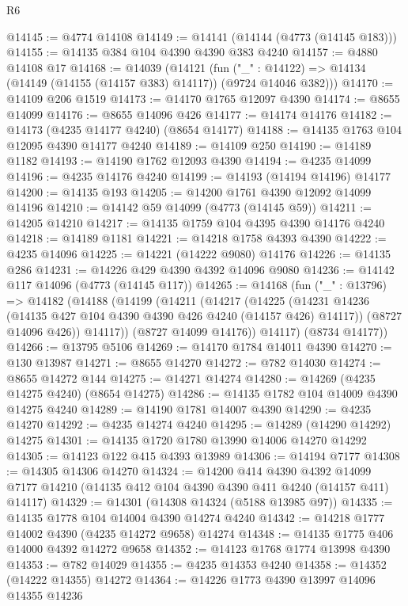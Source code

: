 \begin{lexlean}{R6}
\begin{coremodule}
@14145 := @4774 @14108
@14149 := @14141 (@14144 (@4773 (@14145 @183)))
@14155 := @14135 @384 @104 @4390 @4390 @383 @4240
@14157 := @4880 @14108 @17
@14168 := @14039
    (@14121
      (fun ("_" : @14122) => @14134 (@14149 (@14155 (@14157 @383) @14117)) (@9724 @14046 @382)))
@14170 := @14109 @206 @1519
@14173 := @14170 @1765 @12097 @4390
@14174 := @8655 @14099
@14176 := @8655 @14096 @426
@14177 := @14174 @14176
@14182 := @14173 (@4235 @14177 @4240) (@8654 @14177)
@14188 := @14135 @1763 @104 @12095 @4390 @14177 @4240
@14189 := @14109 @250
@14190 := @14189 @1182
@14193 := @14190 @1762 @12093 @4390
@14194 := @4235 @14099
@14196 := @4235 @14176 @4240
@14199 := @14193 (@14194 @14196) @14177
@14200 := @14135 @193
@14205 := @14200 @1761 @4390 @12092 @14099 @14196
@14210 := @14142 @59 @14099 (@4773 (@14145 @59))
@14211 := @14205 @14210
@14217 := @14135 @1759 @104 @4395 @4390 @14176 @4240
@14218 := @14189 @1181
@14221 := @14218 @1758 @4393 @4390
@14222 := @4235 @14096
@14225 := @14221 (@14222 @9080) @14176
@14226 := @14135 @286
@14231 := @14226 @429 @4390 @4392 @14096 @9080
@14236 := @14142 @117 @14096 (@4773 (@14145 @117))
@14265 := @14168
    (fun ("_" : @13796) =>
    @14182
      (@14188
        (@14199
          (@14211
            (@14217
              (@14225
                (@14231 @14236 (@14135 @427 @104 @4390 @4390 @426 @4240 (@14157 @426) @14117))
                (@8727 @14096 @426))
              @14117))
          (@8727 @14099 @14176))
        @14117)
      (@8734 @14177))
@14266 := @13795 @5106
@14269 := @14170 @1784 @14011 @4390
@14270 := @130 @13987
@14271 := @8655 @14270
@14272 := @782 @14030
@14274 := @8655 @14272 @144
@14275 := @14271 @14274
@14280 := @14269 (@4235 @14275 @4240) (@8654 @14275)
@14286 := @14135 @1782 @104 @14009 @4390 @14275 @4240
@14289 := @14190 @1781 @14007 @4390
@14290 := @4235 @14270
@14292 := @4235 @14274 @4240
@14295 := @14289 (@14290 @14292) @14275
@14301 := @14135 @1720 @1780 @13990 @14006 @14270 @14292
@14305 := @14123 @122 @415 @4393 @13989
@14306 := @14194 @7177
@14308 := @14305 @14306 @14270
@14324 := @14200
    @414
    @4390
    @4392
    @14099
    @7177
    @14210
    (@14135 @412 @104 @4390 @4390 @411 @4240 (@14157 @411) @14117)
@14329 := @14301 (@14308 @14324 (@5188 @13985 @97))
@14335 := @14135 @1778 @104 @14004 @4390 @14274 @4240
@14342 := @14218 @1777 @14002 @4390 (@4235 @14272 @9658) @14274
@14348 := @14135 @1775 @406 @14000 @4392 @14272 @9658
@14352 := @14123 @1768 @1774 @13998 @4390
@14353 := @782 @14029
@14355 := @4235 @14353 @4240
@14358 := @14352 (@14222 @14355) @14272
@14364 := @14226 @1773 @4390 @13997 @14096 @14355 @14236

\end{coremodule}
\end{lexlean}
